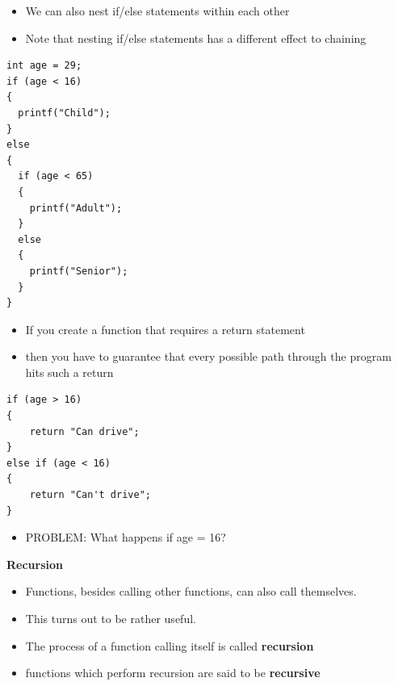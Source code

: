 \documentclass{beamer}
\begin{document}
\begin{frame}[fragile]

\begin{itemize}
\item We can also nest if/else statements within each other 
\item Note that nesting if/else statements has a different effect to chaining
\end{itemize}

\begin{block}{}
\begin{lstlisting}
int age = 29;
if (age < 16)
{
  printf("Child");
}
else
{
  if (age < 65)
  {
    printf("Adult");
  }
  else
  {
    printf("Senior");
  }
}
\end{lstlisting}
\end{block}
\end{frame}

\begin{frame}[fragile]
\begin{itemize}
\item If you create a function that requires a return statement
\item then you have to guarantee that every possible path through the program hits such a return 
\end{itemize}

\begin{block}{}
\begin{lstlisting}
if (age > 16) 
{
    return "Can drive";
} 
else if (age < 16)
{
    return "Can't drive";
}
\end{lstlisting}
\end{block}
\begin{itemize}
\item PROBLEM: What happens if age = 16?
\end{itemize}
\end{frame}

\begin{frame}
 
\textbf{Recursion}
 
\begin{itemize}
\item Functions, besides calling other functions, can also call themselves.
\item This turns out to be rather useful.
\item The process of a function calling itself is called \textbf{recursion} 
\item functions which perform recursion are said to be \textbf{recursive} 
\end{itemize}
\end{frame}
\end{document}
